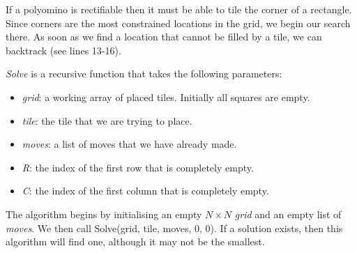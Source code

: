 \documentclass[10pt,a4paper]{article}
\theoremstyle{definition}
\begin{document}
If a polyomino is rectifiable then it must be able to tile the corner of a rectangle.
Since corners are the most constrained locations in the grid, we begin our search there.
As soon as we find a location that cannot be filled by a tile, we can backtrack (see lines 13-16).

\emph{Solve} is a recursive function that takes the following parameters:
\begin{itemize}
\item \emph{grid}: a working array of placed tiles. Initially all squares are empty.
\item \emph{tile}: the tile that we are trying to place.
\item \emph{moves}: a list of moves that we have already made.
\item \emph{R}: the index of the first row that is completely empty.
\item \emph{C}: the index of the first column that is completely empty.
\end{itemize}

The algorithm begins by initialising an empty $N \times N$ \emph{grid} and an empty list of \emph{moves}.
We then call Solve(grid, tile, moves, 0, 0). If a solution exists, then this algorithm will find one,
although it may not be the smallest.
\end{document}
